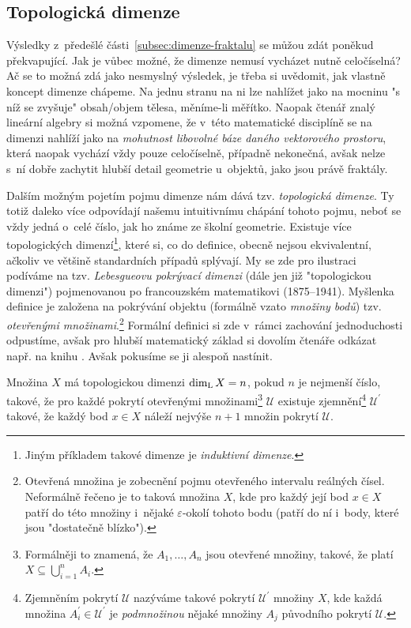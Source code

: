 \subsection{Topologická dimenze}\label{subsec:topologicka-dimenze}

Výsledky z~předešlé části~\ref{subsec:dimenze-fraktalu} se můžou zdát poněkud překvapující. Jak je vůbec možné, že dimenze nemusí vycházet nutně celočíselná? Ač se to možná zdá jako nesmyslný výsledek, je třeba si uvědomit, jak vlastně koncept dimenze chápeme. Na jednu stranu na ni lze nahlížet jako na mocninu "s níž se zvyšuje" obsah/objem tělesa, měníme-li měřítko. Naopak čtenář znalý lineární algebry si možná vzpomene, že v~této matematické disciplíně se na dimenzi nahlíží jako na \emph{mohutnost libovolné báze daného vektorového prostoru}, která naopak vychází vždy pouze celočíselně, případně nekonečná, avšak nelze s~ní dobře zachytit hlubší detail geometrie u~objektů, jako jsou právě fraktály.

Dalším možným pojetím pojmu dimenze nám dává tzv. \emph{topologická dimenze}. Ty totiž daleko více odpovídají našemu intuitivnímu chápání tohoto pojmu, neboť se vždy jedná o~celé číslo, jak ho známe ze školní geometrie. Existuje více topologických dimenzí\footnote{Jiným příkladem takové dimenze je \emph{induktivní dimenze}.}, které si, co do definice, obecně nejsou ekvivalentní, ačkoliv ve většině standardních případů splývají. My se zde pro ilustraci podíváme na tzv. \emph{Lebesgueovu pokrývací dimenzi} (dále jen již "topologickou dimenzi") pojmenovanou po francouzském matematikovi  (1875--1941). Myšlenka definice je založena na pokrývání objektu (formálně vzato \emph{množiny bodů}) tzv. \emph{otevřenými množinami}.\footnote{Otevřená množina je zobecnění pojmu otevřeného intervalu reálných čísel. Neformálně řečeno je to taková množina $X$, kde pro každý její bod $x\in X$ patří do této množiny i~nějaké $\varepsilon$-okolí tohoto bodu (patří do ní i~body, které jsou "dostatečně blízko").} Formální definici si zde v~rámci zachování jednoduchosti odpustíme, avšak pro hlubší matematický základ si dovolím čtenáře odkázat např. na knihu \cite{Engelking1989}. Avšak pokusíme se ji alespoň nastínit.

Množina $X$ má topologickou dimenzi $\operatorname{dim_L}{X}=n$, pokud $n$ je nejmenší číslo, takové, že pro každé pokrytí otevřenými množinami\footnote{Formálněji to znamená, že $A_1,\dots,A_n$ jsou otevřené množiny, takové, že platí $X\subseteq\bigcup_{i=1}^n{A_i}$.} $\mathcal{U}$ existuje zjemnění\footnote{Zjemněním pokrytí $\mathcal{U}$ nazýváme takové pokrytí $\mathcal{U}^\prime$ množiny $X$, kde každá množina $A_i^\prime\in\mathcal{U}^\prime$ je \emph{podmnožinou} nějaké množiny $A_j$ původního pokrytí $\mathcal{U}$.} $\mathcal{U}^\prime$ takové, že každý bod $x\in X$ náleží nejvýše $n+1$ množin pokrytí $\mathcal{U}$.

